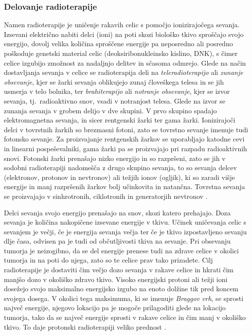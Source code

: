 \documentclass[a4paper,twoside,11pt]{article}
\begin{document}
	\subsubsection*{Delovanje radioterapije}
	\par{
	  Namen radioterapije je uničenje rakavih celic s pomočjo ionizirajočega sevanja. Izsevani električno nabiti delci (ioni) na poti skozi biološko tkivo sproščajo svojo energijo, dovolj velika količina sproščene energije pa neposredno ali posredno poškoduje genetski material celic (deoksiribonukleinsko kislino, DNK), s čimer celice izgubijo zmožnost za nadaljnjo delitev in sčasoma odmrejo. Glede na način dostavljanja sevanja v celice se radioterapija deli na \emph{teleradioterapijo} ali \emph{zunanje obsevanje}, kjer se žarki sevanja oblikujejo zunaj človeškega telesa in se jih usmerja v telo bolnika, ter \emph{brahiterapijo} ali \emph{notranje obsevanje}, kjer se izvor sevanja, tj.~radioaktivno snov, vsadi v notranjost telesa. Glede na izvor se zunanja sevanja v grobem delijo v dve skupini. V prvo skupino spadajo elektromagnetna sevanja, in sicer rentgenski žarki ter gama žarki. Ionizirajoči delci v tovrstnih žarkih so brezmasni fotoni, zato se tovrstno sevanje imenuje tudi fotonsko sevanje. Za proizvajanje rentgenskih žarkov se uporabljajo katodne cevi in linearni pospeševalniki, gama žarki pa se proizvajajo pri razpadu radioaktivnih snovi. Fotonski žarki prenašajo nizko energijo in so razpršeni, zato se jih v sodobni radioterapiji nadomešča z drugo skupino sevanja, to so sevanja delcev (elektronov, protonov in nevtronov) ali težjih ionov (ogljik), ki so zaradi višje energije in manj razpršenih žarkov bolj učinkovita in natančna. Tovrstna sevanja se proizvajajo v sinhrotronih, ciklotronih in generatorjih nevtronov \citep{baskar2012}.
	}
	\par{
	  Delci sevanja svojo energijo prenašajo na snov, skozi katero prehajajo. Doza sevanja je količina nakopičene izsevane energije v tkivu. Učinek uničevanja celic s sevanjem je večji, če je energija sevanja večja ter če je tkivo izpostavljeno sevanju dlje časa, odvisen pa je tudi od občutljivosti tkiva na sevanje. Pri obsevanju tumorja je neizogibno, da se del energije prenese tudi na zdrave celice v okolici tumorja in na poti do njega, zato so te celice prav tako prizadete. Cilj radioterapije je dostaviti čim večjo dozo sevanja v rakave celice in hkrati čim manjšo dozo v okoliško zdravo tkivo. Visoko energijski protoni ali težji ioni dosežejo svojo maksimalno energijsko izgubo na enoto dolžine tik pred koncem svojega dosega. V okolici tega maksimuma, ki se imenuje \emph{Braggov vrh}, se sprosti največ energije, njegovo lokacijo pa je mogoče prilagoditi glede na lokacijo tumorja, tako da se največ energije sprosti v rakave celice in čim manj v okoliško tkivo. To daje protonski radioterapiji veliko prednost \citep{gregoire2015}.
	}
\end{document}
